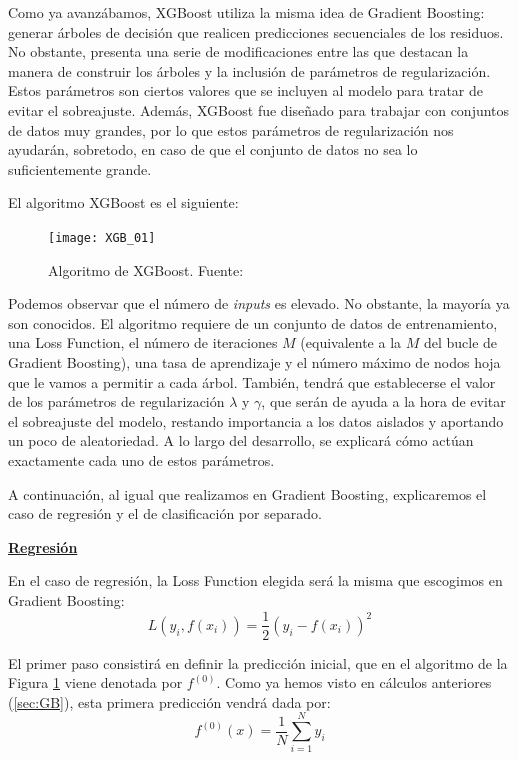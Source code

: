 \documentclass[12pt,twoside]{article}
\begin{document}
Como ya avanzábamos, XGBoost utiliza la misma idea de Gradient Boosting: generar árboles de decisión que realicen predicciones secuenciales de los residuos. No obstante, presenta una serie de modificaciones entre las que destacan la manera de construir los árboles y la inclusión de parámetros de regularización. Estos parámetros son ciertos valores que se incluyen al modelo para tratar de evitar el sobreajuste. Además, XGBoost fue diseñado para trabajar con conjuntos de datos muy grandes, por lo que estos parámetros de regularización nos ayudarán, sobretodo, en caso de que el conjunto de datos no sea lo suficientemente grande.

El algoritmo XGBoost es el siguiente:
\begin{figure}[h]
\centering
\texttt{[image: XGB\_01]}
\caption{Algoritmo de XGBoost. Fuente: \cite{JI01}}
\label{fig:XGB_01}
\end{figure}

Podemos observar que el número de \textit{inputs} es elevado. No obstante, la mayoría ya son conocidos. El algoritmo requiere de un conjunto de datos de entrenamiento, una Loss Function, el número de iteraciones $M$ (equivalente a la $M$ del bucle de Gradient Boosting), una tasa de aprendizaje y el número máximo de nodos hoja que le vamos a permitir a cada árbol. También, tendrá que establecerse el valor de los parámetros de regularización $\lambda$ y $\gamma$, que serán de ayuda a la hora de evitar el sobreajuste del modelo, restando importancia a los datos aislados y aportando un poco de aleatoriedad. A lo largo del desarrollo, se explicará cómo actúan exactamente cada uno de estos parámetros.

A continuación, al igual que realizamos en Gradient Boosting, explicaremos el caso de regresión y el de clasificación por separado.



\bigskip \bigskip

\textbf{\underline{Regresión}}

En el caso de regresión, la Loss Function elegida será la misma que escogimos en Gradient Boosting:
\begin{equation*}
L(y_i, f(x_i)) = \frac{1}{2}(y_i - f(x_i))^2
\end{equation*}

El primer paso consistirá en definir la predicción inicial, que en el algoritmo de la Figura \ref{fig:XGB_01} viene denotada por $f^{(0)}$. Como ya hemos visto en cálculos anteriores (\ref{sec:GB}), esta primera predicción vendrá dada por:
\begin{equation*}
f^{(0)}(x) = \frac{1}{N} \sum_{i=1}^N y_i
\end{equation*}
\end{document}
